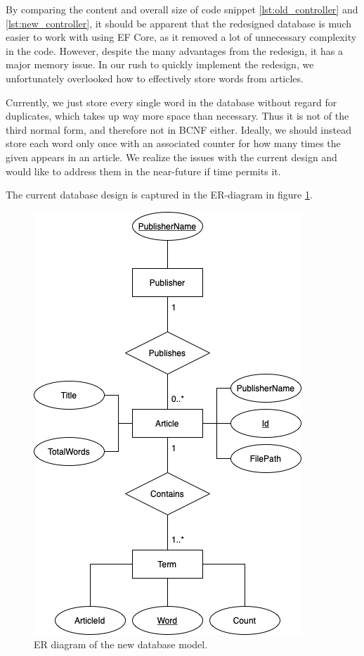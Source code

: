 By comparing the content and overall size of code snippet \ref{lst:old_controller} and \ref{lst:new_controller}, it should be apparent that the redesigned database is much easier to work with using EF Core, as it removed a lot of unnecessary complexity in the code.
However, despite the many advantages from the redesign, it has a major memory issue.
In our rush to quickly implement the redesign, we unfortunately overlooked how to effectively store words from articles. 

Currently, we just store every single word in the database without regard for duplicates, which takes up way more space than necessary. Thus it is not of the third normal form, and therefore not in BCNF either.
Ideally, we should instead store each word only once with an associated counter for how many times the given appears in an article.
We realize the issues with the current design and would like to address them in the near-future if time permits it.

The current database design is captured in the ER-diagram in figure \ref{newdatabaseER}.

\begin{figure}[h]
    \centering
    \includegraphics[scale=0.8]{Images/New database model.png}
    \caption{ER diagram of the new database model.}
    \label{newdatabaseER}
\end{figure}
